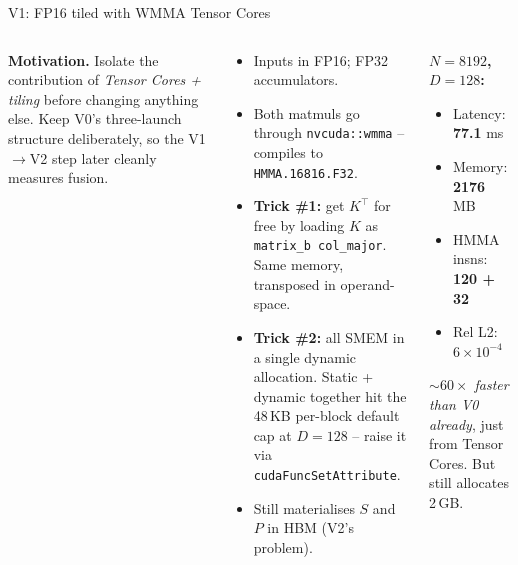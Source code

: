 \documentclass[10pt,aspectratio=169]{beamer}
\begin{document}
\begin{frame}{V1: FP16 tiled with WMMA Tensor Cores}
  \begin{columns}[T]
      \textbf{Motivation.} Isolate the contribution of \emph{Tensor
      Cores + tiling} before changing anything else. Keep V0's
      three-launch structure deliberately, so the V1$\to$V2 step later
      cleanly measures fusion.
      \vspace{0.4em}
      \begin{whatif}
        \begin{itemize}
          \item Inputs in FP16; FP32 accumulators.
          \item Both matmuls go through \texttt{nvcuda::wmma} -- compiles
                to \texttt{HMMA.16816.F32}.
          \item \textbf{Trick \#1:} get $K^\top$ for free by loading $K$
                as \texttt{matrix\_b col\_major}. Same memory,
                transposed in operand-space.
          \item \textbf{Trick \#2:} all SMEM in a single dynamic
                allocation. Static + dynamic together hit the 48\,KB
                per-block default cap at $D = 128$ -- raise it via
                \texttt{cudaFuncSetAttribute}.
          \item Still materialises $S$ and $P$ in HBM (V2's problem).
        \end{itemize}
      \end{whatif}
      \begin{numbers}
        \textbf{$N = 8192$, $D = 128$:}
        \begin{itemize}
          \item Latency: \textbf{77.1} ms
          \item Memory: \textbf{2176} MB
          \item HMMA insns: \textbf{120 + 32}
          \item Rel L2: $6 \times 10^{-4}$
        \end{itemize}
        \emph{$\sim 60\times$ faster than V0 already}, just from
        Tensor Cores. But still allocates 2\,GB.
      \end{numbers}
  \end{columns}
\end{frame}
\end{document}
